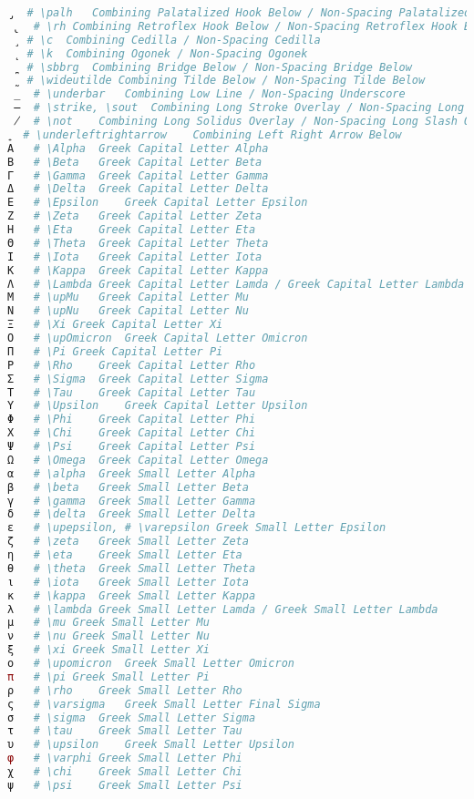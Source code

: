 \begin{lstlisting}[language=Julia, style=julia, linewidth=\textwidth]
 ̡  # \palh   Combining Palatalized Hook Below / Non-Spacing Palatalized Hook Below
 ̢  # \rh Combining Retroflex Hook Below / Non-Spacing Retroflex Hook Below
 ̧  # \c  Combining Cedilla / Non-Spacing Cedilla
 ̨  # \k  Combining Ogonek / Non-Spacing Ogonek
 ̪  # \sbbrg  Combining Bridge Below / Non-Spacing Bridge Below
 ̰  # \wideutilde Combining Tilde Below / Non-Spacing Tilde Below
 ̲  # \underbar   Combining Low Line / Non-Spacing Underscore
 ̶  # \strike, \sout  Combining Long Stroke Overlay / Non-Spacing Long Bar Overlay
 ̸  # \not    Combining Long Solidus Overlay / Non-Spacing Long Slash Overlay
 ͍  # \underleftrightarrow    Combining Left Right Arrow Below
Α   # \Alpha  Greek Capital Letter Alpha
Β   # \Beta   Greek Capital Letter Beta
Γ   # \Gamma  Greek Capital Letter Gamma
Δ   # \Delta  Greek Capital Letter Delta
Ε   # \Epsilon    Greek Capital Letter Epsilon
Ζ   # \Zeta   Greek Capital Letter Zeta
Η   # \Eta    Greek Capital Letter Eta
Θ   # \Theta  Greek Capital Letter Theta
Ι   # \Iota   Greek Capital Letter Iota
Κ   # \Kappa  Greek Capital Letter Kappa
Λ   # \Lambda Greek Capital Letter Lamda / Greek Capital Letter Lambda
Μ   # \upMu   Greek Capital Letter Mu
Ν   # \upNu   Greek Capital Letter Nu
Ξ   # \Xi Greek Capital Letter Xi
Ο   # \upOmicron  Greek Capital Letter Omicron
Π   # \Pi Greek Capital Letter Pi
Ρ   # \Rho    Greek Capital Letter Rho
Σ   # \Sigma  Greek Capital Letter Sigma
Τ   # \Tau    Greek Capital Letter Tau
Υ   # \Upsilon    Greek Capital Letter Upsilon
Φ   # \Phi    Greek Capital Letter Phi
Χ   # \Chi    Greek Capital Letter Chi
Ψ   # \Psi    Greek Capital Letter Psi
Ω   # \Omega  Greek Capital Letter Omega
α   # \alpha  Greek Small Letter Alpha
β   # \beta   Greek Small Letter Beta
γ   # \gamma  Greek Small Letter Gamma
δ   # \delta  Greek Small Letter Delta
ε   # \upepsilon, # \varepsilon Greek Small Letter Epsilon
ζ   # \zeta   Greek Small Letter Zeta
η   # \eta    Greek Small Letter Eta
θ   # \theta  Greek Small Letter Theta
ι   # \iota   Greek Small Letter Iota
κ   # \kappa  Greek Small Letter Kappa
λ   # \lambda Greek Small Letter Lamda / Greek Small Letter Lambda
μ   # \mu Greek Small Letter Mu
ν   # \nu Greek Small Letter Nu
ξ   # \xi Greek Small Letter Xi
ο   # \upomicron  Greek Small Letter Omicron
π   # \pi Greek Small Letter Pi
ρ   # \rho    Greek Small Letter Rho
ς   # \varsigma   Greek Small Letter Final Sigma
σ   # \sigma  Greek Small Letter Sigma
τ   # \tau    Greek Small Letter Tau
υ   # \upsilon    Greek Small Letter Upsilon
φ   # \varphi Greek Small Letter Phi
χ   # \chi    Greek Small Letter Chi
ψ   # \psi    Greek Small Letter Psi

\end{lstlisting}
